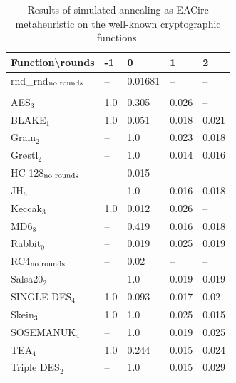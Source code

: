 \documentclass[
    digital,    %
    oneside,    %
    color,
    11pt,
    nocover,
    notable,
    nolof,
    nolot,
]{fithesis3}
\newcommand{\fd}{\cellcolor{red!25}}
\newcommand{\fn}{}
\begin{document}
\begin{table}[H]
\centering
\begin{tabular}{l|l l l l}
\textbf{\large Function\textbackslash{}rounds} & \textbf{\large -1} & \textbf{\large 0} & \textbf{\large 1} & \textbf{\large 2}\\ \hline
rnd\_rnd$_{\textnormal{no rounds}}$ & -- & \fn{}0.01681& -- & --    \\\\
AES$_{3}$        & \fd{}1.0   & \fd{}0.305 & \fn{}0.026 & \fn{}--   \\
BLAKE$_{1}$      & \fd{}1.0   & \fd{}0.051 & \fn{}0.018 & \fn{}0.021\\
Grain$_{2}$      & \fd{}--    & \fd{}1.0   & \fn{}0.023 & \fn{}0.018\\
Gr\o stl$_{2}$   & \fd{}--    & \fd{}1.0   & \fn{}0.014 & \fn{}0.016\\
HC-128$_{\textnormal{no rounds}}$& -- & \fn{}0.015 & -- & --        \\
JH$_{6}$         & \fd{}--    & \fd{}1.0   & \fn{}0.016 & \fn{}0.018\\
Keccak$_{3}$     & \fd{}1.0   & \fn{}0.012 & \fn{}0.026 & \fn{}--   \\
MD6$_{8}$        & \fd{}--    & \fd{}0.419 & \fn{}0.016 & \fn{}0.018\\
Rabbit$_{0}$     &      --    & \fn{}0.019 & \fn{}0.025 & \fn{}0.019\\
RC4$_{\textnormal{no rounds}}$& -- & \fn{}0.02  & --    & --        \\
Salsa20$_{2}$    & \fd{}--    & \fd{}1.0   & \fn{}0.019 & \fn{}0.019\\
SINGLE-DES$_{4}$ & \fd{}1.0   & \fd{}0.093 & \fn{}0.017 & \fn{}0.02 \\
Skein$_{3}$      & \fd{}1.0   & \fd{}1.0   & \fn{}0.025 & \fn{}0.015\\
SOSEMANUK$_{4}$  & \fd{}--    & \fd{}1.0   & \fn{}0.019 & \fn{}0.025\\
TEA$_{4}$        & \fd{}1.0   & \fd{}0.244 & \fn{}0.015 & \fn{}0.024\\
Triple DES$_{2}$ & \fd{}--    & \fd{}1.0   & \fn{}0.015 & \fn{}0.029
\end{tabular}
\caption{Results of simulated annealing as EACirc metaheuristic on the well-known cryptographic functions.}
\label{table:res-usable-sa}
\end{table}
\end{document}
